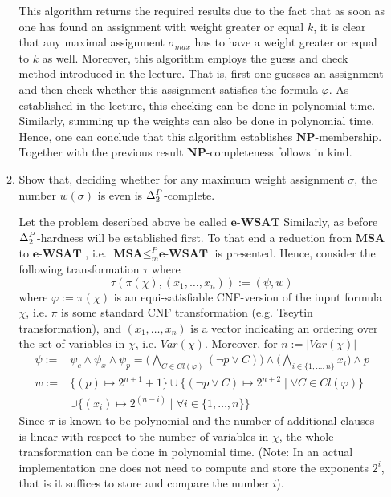 \documentclass[11pt,a4paper]{article}
\newcommand{\NP}{\ensuremath{\mathbf{NP}}\xspace}
\newcommand{\DeltaP}[1]{\ensuremath{\Delta^{\protect{P}}_{#1}}\xspace}
\begin{document}
\begin{enumerate}
\begin{enumerate}
This algorithm returns the required results due to the fact that as soon as one has found an assignment with weight greater or equal $k$, it is clear that any maximal assignment $\sigma_{max}$ has to have a weight greater or equal to $k$ as well. Moreover, this algorithm employs the guess and check method introduced in the lecture. That is, first one guesses an assignment and then check whether this assignment satisfies the formula $\varphi$. As established in the lecture, this checking can be done in polynomial time. Similarly, summing up the weights can also be done in polynomial time. Hence, one can conclude that this algorithm establishes \NP-membership. Together with the previous result \NP-completeness follows in kind.

       \item Show that, deciding whether for any maximum weight assignment
                $\sigma$, the number $w(\sigma)$ is even is $\DeltaP{2}$-complete. 

Let the problem described above be called  $\textbf{e-WSAT}$            
Similarly, as before $\DeltaP{2}$-hardness will be established first. To that end a reduction from $\textbf{MSA}$ to  $\textbf{e-WSAT}$  , i.e.  $\textbf{MSA} \leq_m^P \textbf{e-WSAT}$  is presented. Hence, consider the following transformation $\tau$ where
\begin{equation*}
\tau(\pi(\chi), (x_1, \dots , x_n)) := (\psi, w)
\end{equation*}
where $\varphi:=\pi(\chi)$ is an equi-satisfiable CNF-version of the input formula $\chi$, i.e. $\pi$ is some standard CNF transformation (e.g. Tseytin transformation), and $(x_1, \dots , x_n)$ is a vector indicating an ordering over the set of variables in $\chi$, i.e. $\mathit{Var}(\chi)$. Moreover, for $n:=|\mathit{Var}(\chi)|$
\begin{equation*}
\begin{split}
\psi := &\psi_c \land \psi_x \land \psi_p = \big( \bigwedge_{C \in \mathit{Cl}(\varphi)} (\neg p \lor C) \big) \land \big( \bigwedge_{i \in \{1,\dots,n\}} x_i \big) \land p\\
w := & \{ (p) \mapsto  2^{n+1} +1\} \cup  \{(\neg p \lor C)  \mapsto 2^{n+2} \mid \forall C \in \mathit{Cl}(\varphi)\}\\ 
 & \cup \{  (x_i) \mapsto 2^{(n-i)} \mid \forall i \in \{ 1, \dots, n\}\} 
\end{split}
\end{equation*}
Since $\pi$ is known to be polynomial and the number of additional clauses is linear with respect to the number of variables in $\chi$, the whole transformation can be done in polynomial time. (Note: In an actual implementation one does not need to compute and store the exponents $2^i$, that is it suffices to store and compare the number $i$). \\



\end{enumerate}
\end{enumerate}
\end{document}
